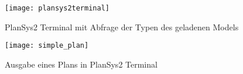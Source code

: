 \begin{figure}[ht!]
    \centering
    \texttt{[image: plansys2terminal]}
    \caption{\ac{PlanSys2} Terminal mit Abfrage der Typen des geladenen Models}
    \label{fig:plansysterminal}
\end{figure}

\begin{figure}[ht!]
    \centering
    \texttt{[image: simple\_plan]}
    \caption{Ausgabe eines Plans in \ac{PlanSys2} Terminal}
    \label{fig:terminalplan}
\end{figure}
